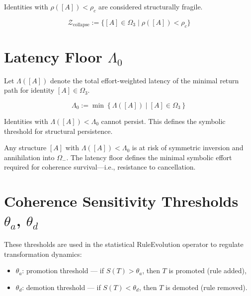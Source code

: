 Identities with $\rho([A]) < \rho_c$ are considered structurally fragile.

\begin{definition}
\begin{equation} \label{eq:collapse-zone-rho}
\mathcal{Z}_{\text{collapse}} := \{ [A] \in \Omega_3 \mid \rho([A]) < \rho_c \}
\end{equation}
\end{definition}

\section{Latency Floor $\Lambda_0$} \label{latency-floor-lambda0}

Let $\Lambda([A])$ denote the total effort-weighted latency of the minimal return path for identity $[A] \in \Omega_3$.

\begin{definition}
\begin{equation} \label{eq:latency-floor}
\Lambda_0 := \min \left\{ \Lambda([A]) \mid [A] \in \Omega_3 \right\}
\end{equation}
\end{definition}

Identities with $\Lambda([A]) < \Lambda_0$ cannot persist. This defines the symbolic threshold for structural persistence.

\medskip

Any structure $[A]$ with $\Lambda([A]) < \Lambda_0$ is at risk of symmetric inversion and annihilation into $\Omega_-$. The latency floor defines the minimal symbolic effort required for coherence survival—i.e., resistance to cancellation.

\section{Coherence Sensitivity Thresholds $\theta_a$, $\theta_d$} \label{coherence-sensitivity-thresholds-thetaa-thetad}

These thresholds are used in the statistical RuleEvolution operator to regulate transformation dynamics:

\begin{itemize}
    \item $\theta_a$: promotion threshold — if $S(T) > \theta_a$, then $T$ is promoted (rule added),
    \item $\theta_d$: demotion threshold — if $S(T) < \theta_d$, then $T$ is demoted (rule removed).
\end{itemize}

